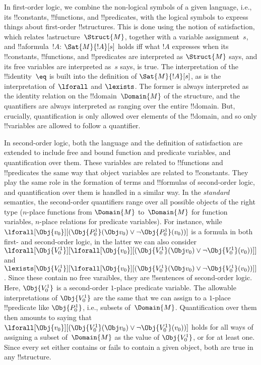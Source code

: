 \documentclass[../../../include/open-logic-section]{subfiles}
\begin{document}


In first-order logic, we combine the non-logical symbols of a given
language, i.e., its !!{constant}s, !!{function}s, and !!{predicate}s,
with the logical symbols to express things about first-order
!!{structure}s.  This is done using the notion of satisfaction, which
relates !a{structure}~$\Struct{M}$, together with a variable
assignment~$s$, and !!a{formula}~$!A$: $\Sat{M}{!A}[s]$ holds iff what
$!A$ expresses when its !!{constant}s, !!{function}s, and
!!{predicate}s are interpreted as $\Struct{M}$ says, and its free
variables are interpreted as~$s$ says, is true.  The interpretation of
the !!{identity}~$\eq$ is built into the definition of
$\Sat{M}{!A}[s]$, as is the interpretation of~$\lforall$ and
$\lexists$. The former is always interpreted as the identity relation
on the !!{domain}~$\Domain{M}$ of the structure, and the quantifiers
are always interpreted as ranging over the entire !!{domain}.  But,
crucially, quantification is only allowed over elements of the
!!{domain}, and so only !!{variable}s are allowed to follow a
quantifier.

In second-order logic, both the language and the definition of
satisfaction are extended to include free and bound function and
predicate variables, and quantification over them.  These variables
are related to !!{function}s and !!{predicate}s the same way that
object variables are related to !!{constant}s.  They play the same
role in the formation of terms and !!{formula}s of second-order logic,
and quantification over them is handled in a similar way.  In the
\emph{standard} semantics, the second-order quantifiers range over all
possible objects of the right type ($n$-place functions from
$\Domain{M}$ to~$\Domain{M}$ for function variables, $n$-place
relations for predicate variables).  For instance, while
$\lforall[\Obj{v_0}][(\Obj{P^1_0}(\Obj v_0) \lor \lnot
  \Obj{P^1_0}(v_0))]$ is a formula in both first- and second-order
logic, in the latter we can also consider
$\lforall[\Obj{V^1_0}][\lforall[\Obj{v_0}][(\Obj{V^1_0}(\Obj v_0) \lor
    \lnot \Obj{V^1_0}(v_0))]]$ and
$\lexists[\Obj{V^1_0}][\lforall[\Obj{v_0}][(\Obj{V^1_0}(\Obj v_0) \lor
    \lnot \Obj{V^1_0}(v_0))]]$. Since these contain no free varaibles,
they are !!{sentence}s of second-order logic. Here, $\Obj{V^1_0}$ is a
second-order $1$-place predicate variable.  The allowable
interpretations of $\Obj{V^1_0}$ are the same that we can assign to a
$1$-place !!{predicate} like $\Obj{P^1_0}$, i.e., subsets
of~$\Domain{M}$.  Quantification over them then amounts to saying that
$\lforall[\Obj{v_0}][(\Obj{V^1_0}(\Obj v_0) \lor \lnot
  \Obj{V^1_0}(v_0))]$ holds for all ways of assigning a subset
of~$\Domain{M}$ as the value of $\Obj{V^1_0}$, or for at least one.
Since every set either contains or fails to contain a given object,
both are true in any !!{structure}.
\end{document}
